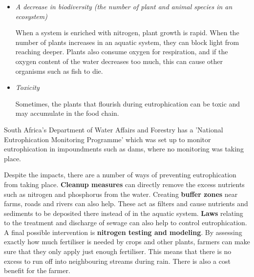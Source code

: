 \begin{itemize}
\item{\textit{A decrease in biodiversity (the number of plant and animal species in an ecosystem)}

When a system is enriched with nitrogen, plant growth is rapid. When the number of plants increases in an aquatic system, they can block light from reaching deeper. Plants also consume oxygen for respiration, and if the oxygen content of the water decreases too much, this can cause other organisms such as fish to die.}

\item{\textit{Toxicity}

Sometimes, the plants that flourish during eutrophication can be toxic and may accumulate in the food chain.}  
\end{itemize}  

\begin{IFact}{
South Africa's Department of Water Affairs and Forestry has a 'National Eutrophication Monitoring Programme' which was set up to monitor eutrophication in impoundments such as dams, where no monitoring was taking place.
}
\end{IFact}

Despite the impacts, there are a number of ways of preventing eutrophication from taking place. \textbf{Cleanup measures} can directly remove the excess nutrients such as nitrogen and phosphorus from the water. Creating \textbf{buffer zones} near farms, roads and rivers can also help. These act as filters and cause nutrients and sediments to be deposited there instead of in the aquatic system. \textbf{Laws} relating to the treatment and discharge of sewage can also help to control eutrophication. A final possible intervention is \textbf{nitrogen testing and modeling}. By assessing exactly how much fertiliser is needed by crops and other plants, farmers can make sure that they only apply just enough fertiliser. This means that there is no excess to run off into neighbouring streams during rain. There is also a cost benefit for the farmer.



